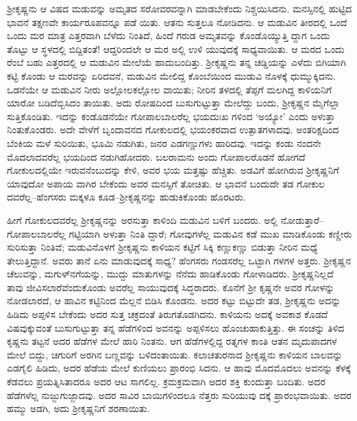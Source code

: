 ಶ್ರೀಕೃಷ್ಣನು ಆ ವಿಷದ ಮಡುವನ್ನು ಅಮೃತದ ಸರೋವರವನ್ನಾಗಿ ಮಾಡಬೇಕೆಂದು ನಿಶ್ಚಯಿಸಿದನು. ಮನಸ್ಸಿನಲ್ಲಿ ಹುಟ್ಟಿದ ಭಾವನೆ ತಕ್ಷಣವೇ ಕಾರ್ಯರೂಪವನ್ನೂ ಪಡೆ ಯಿತು. ಆತನು ಸುತ್ತಲೂ ನೋಡಿದನು. ಆ ಮಡುವಿನ ತೀರದಲ್ಲಿ ಒಂದೆ ಒಂದು ಮರ ಮಾತ್ರ ಎತ್ತರವಾಗಿ ಬೆಳೆದು ನಿಂತಿದೆ, ಹಿಂದೆ ಗರುಡ ಅಮೃತವನ್ನು ಕೊಂಡೊಯ್ಯುತ್ತಿ ದ್ದಾಗ ಒಂದು ತೊಟ್ಟು ಆ ಸ್ಥಳದಲ್ಲಿ ಬಿದ್ದಿತಂತೆ! ಆದ್ದರಿಂದಲೇ ಆ ಮರ ಅಲ್ಲಿ ಉಳಿ ಯುವುದಕ್ಕೆ ಸಾಧ್ಯವಾಯಿತು. ಆ ಮರದ ಒಂದು ರೆಂಬೆ ಬಹು ಎತ್ತರದಲ್ಲಿ ಆ ಮಡುವಿನ ಮೇಲೆಯೆ ಹಾದುಬಂದಿತ್ತು. ಶ್ರೀಕೃಷ್ಣನು ತನ್ನ ಚಡ್ಡಿಯನ್ನು ಎಳೆದು ಬಿಗಿಯಾಗಿ ಕಟ್ಟಿ ಕೊಂಡು ಆ ಮರವನ್ನು ಏರಿದವನೆ, ಮಡುವಿನ ಮೇಲಿದ್ದ ಕೊಂಬೆಯಿಂದ ಮುಡುವಿ ನೊಳಕ್ಕೆ ಧುಮ್ಮುಕ್ಕಿದನು. ಒಡನೆಯೇ ಆ ಮಡುವಿನ ನೀರು ಅಲ್ಲೋಲಕಲ್ಲೋಲ ವಾಯಿತು; ನೀರಿನ ತಳದಲ್ಲಿ ತೆಪ್ಪಗೆ ಮಲಗಿದ್ದ ಕಾಳಿಯನಿಗೆ ಯಾರೋ ಬಡಿದೆಬ್ಬಿಸಿದಂ ತಾಯಿತು. ಅದು ರೋಷದಿಂದ ಬುಸುಗುಟ್ಟುತ್ತಾ ಮೇಲೆದ್ದು ಬಂದು, ಶ್ರೀಕೃಷ್ಣನ ಮೈಗೆಲ್ಲಾ ಸುತ್ತಿಕೊಂಡಿತು. ಇದನ್ನು ಕಂಡೊಡನೆಯೇ ಗೋಪಾಲಬಾಲರೆಲ್ಲ ಭಯದುಃಖ ಗಳಿಂದ ‘ಅಯ್ಯೋ’ ಎಂದು ಅಳುತ್ತಾ ನಿಂತುಕೊಂಡರು. ಅದೇ ವೇಳೆಗೆ ಬೃಂದಾವನದ ಗೋಕುಲದಲ್ಲಿ ಭಯಂಕರವಾದ ಉತ್ಪಾತಗಳಾದವು. ಅಂತರಿಕ್ಷದಿಂದ ಬೆಂಕಿಯ ಮಳೆ ಸುರಿಯಿತು, ಭೂಮಿ ನಡುಗಿತು, ಜನರ ಎಡಗಣ್ಣುಗಳು ಹಾರಿದವು. ಇದನ್ನು ಕಂಡು ನಂದನೇ ಮೊದಲಾದವರೆಲ್ಲ ಭಯದಿಂದ ನಡುಗಿಹೋದರು. ಬಲರಾಮನು ಅಂದು ಗೋಪಾಲರೊಡನೆ ಹೋಗದೆ ಗೋಕುಲದಲ್ಲಿಯೇ ಇರುವನೆಂಬುದನ್ನು ಕೇಳಿ, ಅವರ ಭಯ ಮತ್ತಷ್ಟು ಹೆಚ್ಚಿತು. ಅಡವಿಗೆ ಹೋಗಿರುವ ಶ್ರೀಕೃಷ್ಣನಿಗೆ ಯಾವುದೋ ಅಪಾಯ ವಾಗಿರ ಬೇಕೆಂದು ಅವರ ಮನಸ್ಸಿಗೆ ತೋಚಿತು. ಆ ಭಾವನೆ ಬಂದುದೇ ತಡ ಗೋಕುಲ ದವರೆಲ್ಲ–ಹೆಂಗಸರು ಮಕ್ಕಳೂ ಕೂಡ–ಶ್ರೀಕೃಷ್ಣನನ್ನು ಹುಡುಕಿಕೊಂಡು ಹೊರಟರು.

ಹೀಗೆ ಗೋಕುಲದವರೆಲ್ಲ ಶ್ರೀಕೃಷ್ಣನನ್ನು ಅರಸುತ್ತಾ ಕಾಳಿಂದಿ ಮಡುವಿನ ಬಳಿಗೆ ಬಂದರು. ಅಲ್ಲಿ ನೋಡುತ್ತಾರೆ–ಗೋಪಾಲಬಾಲರೆಲ್ಲ ಗಟ್ಟಿಯಾಗಿ ಅಳುತ್ತಾ ನಿಂತಿ ದ್ದಾರೆ; ಗೋವುಗಳೆಲ್ಲ ಮಡುವಿನ ಕಡೆ ಮುಖ ಮಾಡಿಕೊಂಡು ಕಣ್ಣೀರು ಸುರಿಸುತ್ತಾ ನಿಂತಿವೆ; ಮಡುವಿನೊಳಗೆ ಶ್ರೀಕೃಷ್ಣನು ಕಾಳಿಯನ ಕಟ್ಟಿಗೆ ಸಿಕ್ಕಿ ಕಣ್ಣುಕಣ್ಣು ಬಿಡುತ್ತಾ ನೀರಿನ ಮಧ್ಯೆ ತೇಲುತ್ತಿದ್ದಾನೆ. ಅವರು ತಾನೆ ಏನು ಮಾಡುವುದಕ್ಕೆ ಸಾಧ್ಯ? ಹೆಂಗಸರು ಗಂಡಸರೆಲ್ಲ ಒಟ್ಟಾಗಿ ಗಳಗಳ ಅತ್ತರು. ಶ್ರೀಕೃಷ್ಣನ ಚೆಲುವನ್ನು, ಮಗುಳ್​ನಗೆಯನ್ನು, ಮುದ್ದು ಮಾತುಗಳನ್ನು ನೆನೆದು ಹಾಡಿಕೊಂಡು ಗೋಳಾಡಿದರು. ಶ್ರೀಕೃಷ್ಣನಿಲ್ಲದೆ ತಾವು ಜೀವಿಸಲಾರೆವೆಂದುಕೊಂಡು ಅವರೆಲ್ಲ ಸಾಯುವುದಕ್ಕೆ ಸಿದ್ಧರಾದರು. ಕೊನೆಗೆ ಶ್ರೀ ಕೃಷ್ಣನೇ ಅವರ ಗೋಳನ್ನು ನೋಡಲಾರದೆ, ಆ ಹಾವಿನ ಕಟ್ಟಿನಿಂದ ಮೆಲ್ಲನೆ ಬಿಡಿಸಿ ಕೊಂಡನು. ಅದರ ಕಟ್ಟು ಬಿಟ್ಟುದೇ ತಡ, ಶ್ರೀಕೃಷ್ಣನು ಅದನ್ನು ಹಿಡಿದು ಅಪ್ಪಳಿಸ ಬೇಕೆಂದು ಅದರ ಸುತ್ತ ಚಕ್ರದಂತೆ ತಿರುಗತೊಡಗಿದನು. ಕಾಳಿಯನು ಅದಕ್ಕೆ ಅವಕಾಶ ಕೊಡದೆ ವಿಷವುಕ್ಕುವಂತೆ ಬುಸುಗುಟ್ಟುತ್ತಾ ತನ್ನ ಹೆಡೆಗಳಿಂದ ಅವನನ್ನು ಅಪ್ಪಳಿಸಲು ಹೊಂಚುಹಾಕುತ್ತಿತ್ತು. ಈ ಸಂಚನ್ನು ತಿಳಿದ ಕೃಷ್ಣನು ತಟ್ಟನೆ ಅದರ ಹೆಡೆಗಳ ಮೇಲೆ ಹಾರಿ ನಿಂತನು. ಆಗ ಹೆಡೆಗಳಲ್ಲಿದ್ದ ರತ್ನಗಳ ಕಾಂತಿ ಆತನ ಮೃದುಪಾದಗಳ ಮೇಲೆ ಬಿದ್ದು, ಚಿಗುರಿಗೆ ಅರಗಿನ ಬಣ್ಣವನ್ನು ಬಳಿದಂತಾಯಿತು. ಕಲಾಚತುರನಾದ ಶ್ರೀಕೃಷ್ಣನು ಕಾಳಿಯನ ಬಾಲವನ್ನು ಎಡಗೈಲಿ ಹಿಡಿದು, ಅದರ ಹೆಡೆಯ ಮೇಲೆ ಕುಣಿಯಲು ಪ್ರಾರಂಭಿ ಸಿದನು. ಆ ಹಾವು ಮೊದಮೊದಲು ಅವನನ್ನು ಕೆಳಕ್ಕೆ ಕೆಡವಲು ಪ್ರಯತ್ನಿಸಿತಾದರೂ ಅದರ ಆಟ ಸಾಗಲಿಲ್ಲ. ಕ್ರಮಕ್ರಮವಾಗಿ ಅದರ ಶಕ್ತಿ ಕುಂದುತ್ತಾ ಬಂದಿತು. ಅದರ ಹೆಡೆಗಳೆಲ್ಲ ನುಜ್ಜುಗುಜ್ಜಾದವು. ಅದರ ಸಾವಿರ ಬಾಯಿಗಳಿಂದಲೂ ನೆತ್ತರು ಸುರಿಯುವು ದಕ್ಕೆ ಪ್ರಾರಂಭವಾಯಿತು. ಅದರ ಹಮ್ಮು ಅಡಗಿ, ಅದು ಶ್ರೀಕೃಷ್ಣನಿಗೆ ಶರಣಾಯಿತು.

